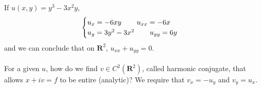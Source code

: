 \vspace{2ex}
\begin{ex}
If $u(x,y)=y^3-3x^2y$,
\[\begin{cases}
u_{x}=-6xy\hspace{5ex}u_{xx}=-6x\\
u_{y}=3y^2-3x^2\hspace{5ex}u_{yy}=6y
\end{cases}\]
and we can conclude that on ${\bm R}^2$, $u_{xx}+u_{yy}=0$.
\\\\
For a given $u$, how do we find $v\in C^2({\bm R}^2)$, called harmonic conjugate, that allows $x+iv=f$ to be entire (analytic)? We require that $v_{x}=-u_{y}$ and $v_{y}=u_{x}$. 
\end{ex}
\vspace{2ex}
